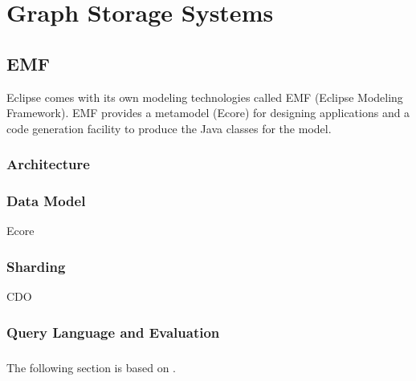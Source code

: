 \section{Graph Storage Systems}
\label{graph-storage-systems}


\subsection{EMF}
\label{emf}

Eclipse comes with its own modeling technologies called EMF (Eclipse Modeling Framework). EMF provides a metamodel (Ecore) for designing applications and a code generation facility to produce the Java classes for the model.


\subsubsection{Architecture}


\subsubsection{Data Model}

Ecore

\subsubsection{Sharding}

CDO

\subsubsection{Query Language and Evaluation}


\subsubsection{\eiq{}}
\label{subsec:eiq}

The following section is based on \cite{CsikosMasters}.


